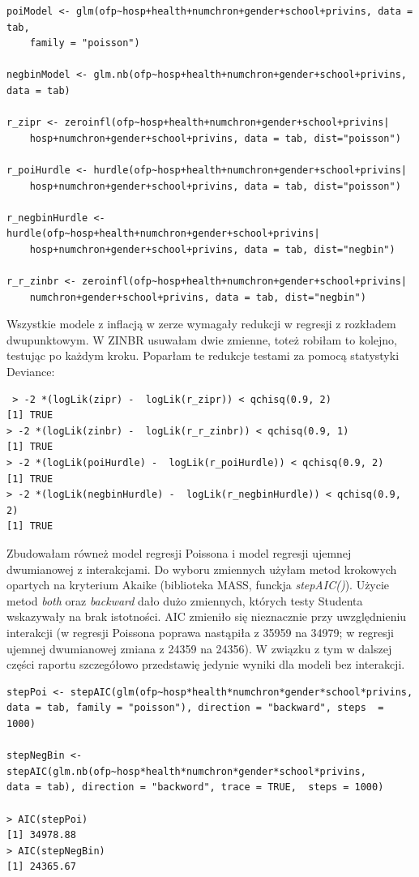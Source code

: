 \documentclass[a4paper,11pt]{article}
\begin{document}
\begin{verbatim}
poiModel <- glm(ofp~hosp+health+numchron+gender+school+privins, data = tab, 
	family = "poisson")
	
negbinModel <- glm.nb(ofp~hosp+health+numchron+gender+school+privins, data = tab)

r_zipr <- zeroinfl(ofp~hosp+health+numchron+gender+school+privins|
	hosp+numchron+gender+school+privins, data = tab, dist="poisson")
	
r_poiHurdle <- hurdle(ofp~hosp+health+numchron+gender+school+privins|
	hosp+numchron+gender+school+privins, data = tab, dist="poisson")
	
r_negbinHurdle <- hurdle(ofp~hosp+health+numchron+gender+school+privins|
	hosp+numchron+gender+school+privins, data = tab, dist="negbin")
	
r_r_zinbr <- zeroinfl(ofp~hosp+health+numchron+gender+school+privins|
	numchron+gender+school+privins, data = tab, dist="negbin")
\end{verbatim}

Wszystkie modele z inflacją w zerze wymagały redukcji w regresji z rozkładem dwupunktowym. W ZINBR usuwałam dwie zmienne, toteż robiłam to kolejno, testując po każdym kroku. Poparłam te redukcje testami za pomocą statystyki Deviance:

\begin{verbatim}
 > -2 *(logLik(zipr) -  logLik(r_zipr)) < qchisq(0.9, 2)
[1] TRUE
> -2 *(logLik(zinbr) -  logLik(r_r_zinbr)) < qchisq(0.9, 1)
[1] TRUE
> -2 *(logLik(poiHurdle) -  logLik(r_poiHurdle)) < qchisq(0.9, 2)
[1] TRUE
> -2 *(logLik(negbinHurdle) -  logLik(r_negbinHurdle)) < qchisq(0.9, 2)
[1] TRUE
\end{verbatim}

Zbudowałam równeż  model regresji Poissona i model regresji ujemnej dwumianowej z interakcjami. Do wyboru zmiennych użyłam metod krokowych opartych na kryterium Akaike (biblioteka MASS, funckja \textit{stepAIC()}). Użycie metod \textit{both} oraz \textit{backward} dało dużo zmiennych, których testy Studenta wskazywały na brak istotności.  AIC zmieniło się nieznacznie przy uwzględnieniu interakcji (w regresji Poissona poprawa nastąpiła z 35959 na 34979; w  regresji ujemnej dwumianowej zmiana z 24359 na 24356). W związku z tym w dalszej części raportu szczegółowo przedstawię jedynie wyniki dla modeli bez interakcji.  


\begin{verbatim}
stepPoi <- stepAIC(glm(ofp~hosp*health*numchron*gender*school*privins, 
data = tab, family = "poisson"), direction = "backward", steps  = 1000)

stepNegBin <- stepAIC(glm.nb(ofp~hosp*health*numchron*gender*school*privins, 
data = tab), direction = "backword", trace = TRUE,  steps = 1000)

> AIC(stepPoi)
[1] 34978.88
> AIC(stepNegBin)
[1] 24365.67
\end{verbatim}
\end{document}
